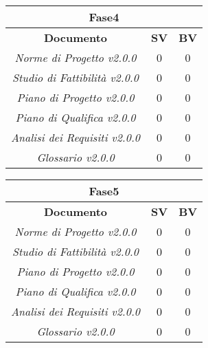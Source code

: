 \vspace{3mm}
\begin{center}
\begin{tabular}{|c|c|c|}
\toprule
\multicolumn{3}{c}{\textbf{Fase4}} \\
\hline
\textbf{Documento} & \textbf{SV} & \textbf{BV} \\ 
\hline
\textit{Norme di Progetto v2.0.0} & 0 & 0 \\ 
\textit{Studio di Fattibilità v2.0.0} & 0 & 0 \\ 
\textit{Piano di Progetto v2.0.0} & 0 & 0 \\ 
\textit{Piano di Qualifica v2.0.0} & 0 & 0 \\ 
\textit{Analisi dei Requisiti v2.0.0} & 0 & 0 \\ 
\textit{Glossario v2.0.0} & 0 & 0 \\ 
\hline
\end{tabular}
\end{center}
\vspace{3mm}
\begin{center}
\begin{tabular}{|c|c|c|}
\toprule
\multicolumn{3}{c}{\textbf{Fase5}} \\
\hline
\textbf{Documento} & \textbf{SV} & \textbf{BV} \\ 
\hline
\textit{Norme di Progetto v2.0.0} & 0 & 0 \\ 
\textit{Studio di Fattibilità v2.0.0} & 0 & 0 \\ 
\textit{Piano di Progetto v2.0.0} & 0 & 0 \\ 
\textit{Piano di Qualifica v2.0.0} & 0 & 0 \\ 
\textit{Analisi dei Requisiti v2.0.0} & 0 & 0 \\ 
\textit{Glossario v2.0.0} & 0 & 0 \\ 
\hline
\end{tabular}

\end{center}
